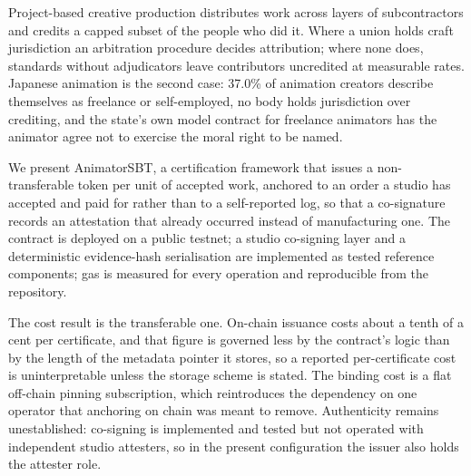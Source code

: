 
Project-based creative production distributes work across layers of
subcontractors and credits a capped subset of the people who did it. Where a union
holds craft jurisdiction an arbitration procedure decides attribution; where none
does, standards without adjudicators leave contributors uncredited at measurable
rates. Japanese animation is the second case: 37.0\% of animation creators describe
themselves as freelance or self-employed, no body holds jurisdiction over crediting, and
the state's own model contract for freelance animators has the animator agree not
to exercise the moral right to be named.

We present AnimatorSBT, a certification framework that issues a non-transferable
token per unit of accepted work, anchored to an order a studio has accepted and
paid for rather than to a self-reported log, so that a co-signature records an
attestation that already occurred instead of manufacturing one. The contract is
deployed on a public testnet; a studio co-signing layer and a deterministic
evidence-hash serialisation are implemented as tested reference components; gas is
measured for every operation and reproducible from the repository.

The cost result is the transferable one. On-chain issuance costs about a tenth of
a cent per certificate, and that figure is governed less by the contract's logic
than by the length of the metadata pointer it stores, so a reported
per-certificate cost is uninterpretable unless the storage scheme is stated. The
binding cost is a flat off-chain pinning subscription, which reintroduces the
dependency on one operator that anchoring on chain was meant to remove.
Authenticity remains unestablished: co-signing is implemented and tested but not
operated with independent studio attesters, so in the present configuration the
issuer also holds the attester role.
